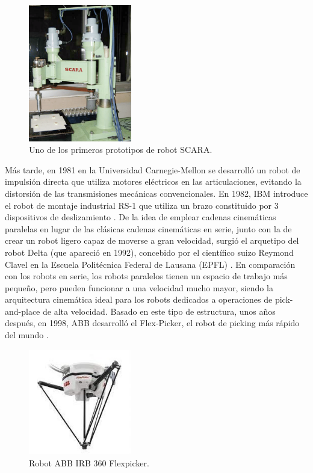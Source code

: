   \begin{figure} [h!]
    \begin{center}
      \includegraphics[width=45mm]{figs/Scara.png}
    \end{center}
    \caption{Uno de los primeros prototipos de robot SCARA.}
    \label{fig:Scara}
  \end{figure}
  
  \pagebreak
  
Más tarde, en 1981 en la Universidad Carnegie-Mellon se desarrolló un robot de impulsión directa que utiliza motores eléctricos en las articulaciones, evitando la distorsión de las transmisiones mecánicas convencionales. En 1982, IBM introduce el robot de montaje industrial RS-1 que utiliza un brazo constituido por 3 dispositivos de deslizamiento \cite{Sanchez07b}. De la idea de emplear cadenas cinemáticas paralelas en lugar de las clásicas cadenas cinemáticas en serie, junto con la de crear un robot ligero capaz de moverse a gran velocidad, surgió el arquetipo del robot Delta (que apareció en 1992), concebido por el científico suizo Reymond Clavel en la Escuela Politécnica Federal de Lausana (EPFL) \cite{Clavel91}. En comparación con los robots en serie, los robots paralelos tienen un espacio de trabajo más pequeño, pero pueden funcionar a una velocidad mucho mayor, siendo la arquitectura cinemática ideal para los robots dedicados a operaciones de pick-and-place de alta velocidad. Basado en este tipo de estructura, unos años después, en 1998, ABB desarrolló el Flex-Picker, el robot de picking más rápido del mundo \cite{Gasparetto19}.\\
  
  \begin{figure} [h!]
    \begin{center}
      \includegraphics[width=45mm]{figs/flexpicker_ABB.jpeg}
    \end{center}
    \caption{Robot ABB IRB 360 Flexpicker.}
    \label{fig:Flexpicker_ABB}
  \end{figure}
  

